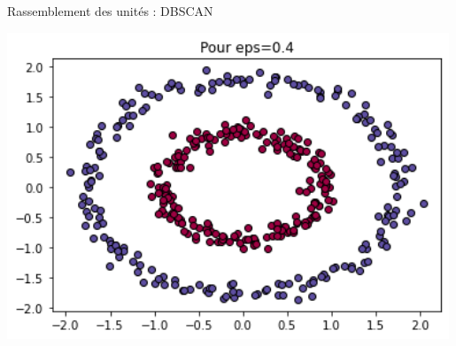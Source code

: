 \documentclass[french]{beamer}
\begin{document}
\begin{frame}{Rassemblement des unités : DBSCAN}
\begin{minipage}{0.5\textwidth}
		\includegraphics[width=0.99\textwidth]{dbscan.png}
	\end{minipage}
\end{frame}
\end{document}
